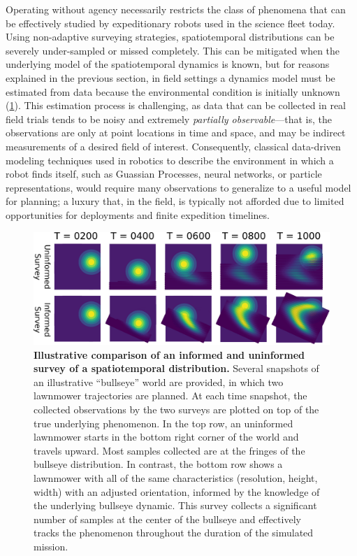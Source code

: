 Operating without agency necessarily restricts the class of phenomena that can be effectively studied by expeditionary robots used in the science fleet today.
Using non-adaptive surveying strategies, spatiotemporal distributions can be severely under-sampled or missed completely\autocite{flaspohler2019information, preston2019adaptive}.
This can be mitigated when the underlying model of the spatiotemporal dynamics is known, but for reasons explained in the previous section, in field settings a dynamics model must be estimated from data because the environmental condition is initially unknown (\cref{fig:intro_traj}).
This estimation process is challenging, as data that can be collected in real field trials tends to be noisy and extremely \emph{partially observable}---that is, the observations are only at point locations in time and space, and may be indirect measurements of a desired field of interest. 
Consequently, classical data-driven modeling techniques used in robotics to describe the environment in which a robot finds itself, such as Guassian Processes\autocite{Rasmussen2004}, neural networks\autocite{cohn1994neural,wang2017predrnn}, or particle representations\autocite{Silver2010}, would require many observations to generalize to a useful model for planning; a luxury that, in the field, is typically not afforded due to limited opportunities for deployments and finite expedition timelines.


\begin{figure}[h!]
  \centering
  \includegraphics[width=1\columnwidth]{figures/intro_lawn.png}
  \caption[Comparison of informed and uninformed survey of spatiotemporal distribution.]{\textbf{Illustrative comparison of an informed and uninformed survey of a spatiotemporal distribution.} Several snapshots of an illustrative ``bullseye'' world are provided, in which two lawnmower trajectories are planned. At each time snapshot, the collected observations by the two surveys are plotted on top of the true underlying phenomenon. In the top row, an uninformed lawnmower starts in the bottom right corner of the world and travels upward.  Most samples collected are at the fringes of the bullseye distribution. In contrast, the bottom row shows a lawnmower with all of the same characteristics (resolution, height, width) with an adjusted orientation, informed by the knowledge of the underlying bullseye dynamic. This survey collects a significant number of samples at the center of the bullseye and effectively tracks the phenomenon throughout the duration of the simulated mission.}
  \label{fig:intro_traj}
\end{figure}

